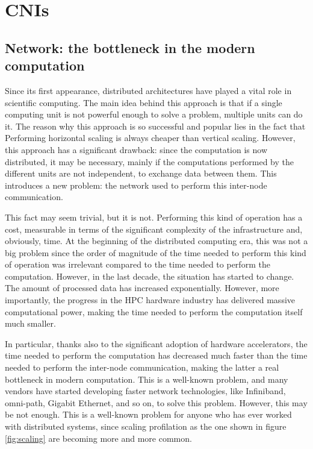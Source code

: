 \chapter{CNIs}\label{chpt:cni}


\section{Network: the bottleneck in the modern computation}\label{sec:network}

Since its first appearance, distributed architectures have played a vital role
in scientific computing. The main idea behind this approach is that if a single
computing unit is not powerful enough to solve a problem, multiple units can do
it.
The reason why this approach is so successful and popular lies in the fact that
Performing horizontal scaling is always cheaper than vertical scaling.
However, this approach has a significant drawback: since the computation is
now distributed, it may be necessary, mainly if the computations performed by
the different units are not independent, to exchange data between them. This
introduces a new problem: the network used to perform this inter-node
communication.

This fact may seem trivial, but it is not. Performing this kind of
operation has a cost, measurable in terms of the significant complexity of the
infrastructure and, obviously, time. At the beginning of the
distributed computing era, this was not a big problem since the order of
magnitude of the time needed to perform this kind of operation was irrelevant
compared to the time needed to perform the computation.
However, in the last decade, the situation has started to change. The amount of
processed data has increased exponentially. However, more importantly, the
progress in the HPC hardware industry has delivered massive computational power,
making the time needed to perform the computation itself much smaller.

In particular, thanks also to the significant adoption of hardware accelerators,
the time needed to perform the computation has decreased much faster than the
time needed to perform the inter-node communication, making the latter a real
bottleneck in modern computation.
This is a well-known problem, and many vendors have started developing
faster network technologies, like Infiniband, omni-path, Gigabit Ethernet, and
so on, to solve this problem. However, this may be not enough.
This is a well-known problem for anyone who has ever worked with distributed
systems, since scaling profilation as the one shown in figure \ref{fig:scaling}
are becoming more and more common.


